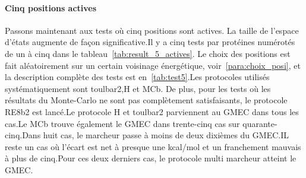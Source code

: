    \paragraph{Cinq positions actives}
Passons maintenant aux tests où cinq positions sont actives. La taille de l'espace d'états augmente de façon significative.Il y a cinq tests par protéines numérotés de un à cinq dans le tableau~\ref{tab:result_5_actives}. Le choix des positions est fait aléatoirement sur un certain voisinage énergétique, voir~\ref{para:choix_posi}, et la description complète des tests est en~\ref{tab:test5}.Les protocoles utilisés systématiquement sont toulbar2,H et MCb. De plus, pour les tests où les résultats du Monte-Carlo ne sont pas complètement satisfaisants, le protocole RE8b2 est lancé.Le protocole H et toulbar2 parviennent au GMEC dans tous les cas.Le MCb trouve également le GMEC dans trente-cinq cas sur quarante-cinq.Dans huit cas, le marcheur passe à moins de deux dixièmes du GMEC.IL reste un cas où l'écart est net à presque une kcal/mol et un franchement mauvais à plus de cinq.Pour ces deux derniers cas, le protocole multi marcheur atteint le GMEC.

